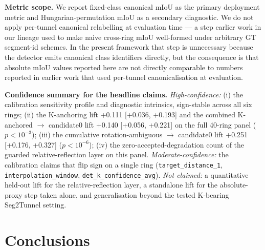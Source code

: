 \documentclass[a4paper,fleqn]{cas-dc}
\begin{document}
\textbf{Metric scope.} We report fixed-class canonical mIoU as the primary deployment metric and Hungarian-permutation mIoU as a secondary diagnostic. We do not apply per-tunnel canonical relabelling at evaluation time --- a step earlier work in our lineage used to make naive cross-ring mIoU well-formed under arbitrary GT segment-id schemes. In the present framework that step is unnecessary because the detector emits canonical class identifiers directly, but the consequence is that absolute mIoU values reported here are not directly comparable to numbers reported in earlier work that used per-tunnel canonicalisation at evaluation.

\textbf{Confidence summary for the headline claims.} \emph{High-confidence:} (i) the calibration sensitivity profile and diagnostic intrinsics, sign-stable across all six rings; (ii) the K-anchoring lift +0.111 [+0.036, +0.193] and the combined K-anchored $\to$ candidate0 lift +0.140 [+0.056, +0.221] on the full 40-ring panel ($p<10^{-3}$); (iii) the cumulative rotation-ambiguous $\to$ candidate0 lift +0.251 [+0.176, +0.327] ($p<10^{-6}$); (iv) the zero-accepted-degradation count of the guarded relative-reflection layer on this panel. \emph{Moderate-confidence:} the calibration claims that flip sign on a single ring (\texttt{target\_distance\_1}, \texttt{interpolation\_window}, \texttt{det\_k\_confidence\_avg}). \emph{Not claimed:} a quantitative held-out lift for the relative-reflection layer, a standalone lift for the absolute-proxy step taken alone, and generalisation beyond the tested K-bearing Seg2Tunnel setting.

\section{Conclusions}\label{sec:conclusions}
\end{document}
